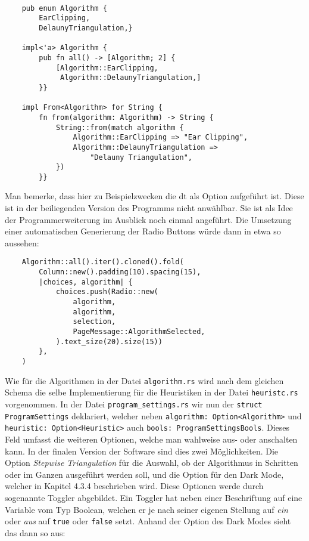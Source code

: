 \begin{lstlisting}

    pub enum Algorithm {
        EarClipping,
        DelaunyTriangulation,}

    impl<'a> Algorithm {
        pub fn all() -> [Algorithm; 2] {
            [Algorithm::EarClipping,
             Algorithm::DelaunyTriangulation,]
        }}

    impl From<Algorithm> for String {
        fn from(algorithm: Algorithm) -> String {
            String::from(match algorithm {
                Algorithm::EarClipping => "Ear Clipping",
                Algorithm::DelaunyTriangulation => 
                    "Delauny Triangulation",
            })
        }}
\end{lstlisting}
Man bemerke, dass hier zu Beispielzwecken die \ac{dt} als Option aufgeführt ist. Diese ist in der beiliegenden Version des Programms nicht anwählbar. Sie 
ist als Idee der Programmerweiterung im Ausblick noch einmal angeführt.
Die Umsetzung einer automatischen Generierung der Radio Buttons würde dann in etwa so aussehen:

\begin{lstlisting}
    Algorithm::all().iter().cloned().fold(
        Column::new().padding(10).spacing(15),
        |choices, algorithm| {
            choices.push(Radio::new(
                algorithm,
                algorithm,
                selection,
                PageMessage::AlgorithmSelected,
            ).text_size(20).size(15))
        },
    )
\end{lstlisting}

Wie für die Algorithmen in der Datei \lstinline{algorithm.rs} wird nach dem gleichen Schema die selbe Implementierung für die Heuristiken in der Datei \lstinline{heuristc.rs} vorgenommen.
In der Datei \lstinline{program_settings.rs} wir nun der \lstinline{struct ProgramSettings} deklariert, welcher neben  \lstinline{algorithm: Option<Algorithm>} und \lstinline{heuristic: Option<Heuristic>}
auch \lstinline{bools: ProgramSettingsBools}. Dieses Feld umfasst die weiteren Optionen, welche man wahlweise aus- oder anschalten kann. In der finalen Version der Software sind dies zwei Möglichkeiten.
Die Option \emph{Stepwise Triangulation} für die Auswahl, ob der Algorithmus in Schritten oder im Ganzen ausgeführt werden soll, und die Option für den Dark Mode, welcher in Kapitel 4.3.4 beschrieben wird.
Diese Optionen werde durch sogenannte Toggler abgebildet. Ein Toggler hat neben einer Beschriftung auf eine Variable vom Typ Boolean, welchen er je nach seiner eigenen Stellung auf \emph{ein} oder \emph{aus} auf 
\lstinline{true} oder \lstinline{false} setzt. Anhand der Option des Dark Modes sieht das dann so aus:

